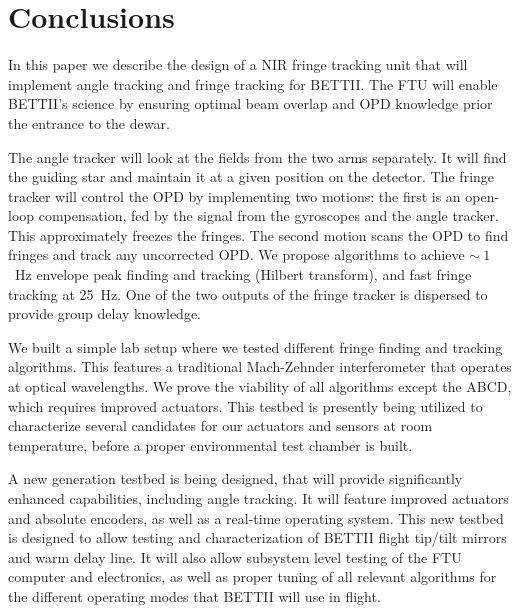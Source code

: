 \section{Conclusions}

In this paper we describe the design of a NIR fringe tracking unit that will implement angle tracking and fringe tracking for BETTII. The FTU will enable BETTII's science by ensuring optimal beam overlap and OPD knowledge prior the entrance to the dewar. 

The angle tracker will look at the fields from the two arms separately. It will find the guiding star and maintain it at a given position on the detector. The fringe tracker will control the OPD by implementing two motions: the first is an open-loop compensation, fed by the signal from the gyroscopes and the angle tracker. This approximately freezes the fringes. The second motion scans the OPD to find fringes and track any uncorrected OPD. We propose algorithms to achieve $\sim~1$~Hz envelope peak finding and tracking (Hilbert transform), and fast fringe tracking at 25~Hz. One of the two outputs of the fringe tracker is dispersed to provide group delay knowledge.

We built a simple lab setup where we tested different fringe finding and tracking algorithms. This features a traditional Mach-Zehnder interferometer that operates at optical wavelengths. We prove the viability of all algorithms except the ABCD, which requires improved actuators. This testbed is presently being utilized to characterize several candidates for our actuators and sensors at room temperature, before a proper environmental test chamber is built.

A new generation testbed is being designed, that will provide significantly enhanced capabilities, including angle tracking. It will feature improved actuators and absolute encoders, as well as a real-time operating system. This new testbed is designed to allow testing and characterization of BETTII flight tip/tilt mirrors and warm delay line. It will also allow subsystem level testing of the FTU computer and electronics, as well as proper tuning of all relevant algorithms for the different operating modes that BETTII will use in flight.